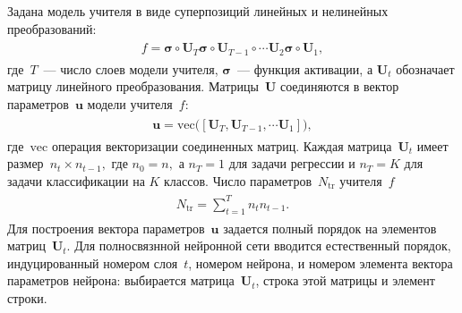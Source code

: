 \documentclass[12pt]{a&t}
\begin{document}
Задана модель учителя в виде суперпозиций линейных и нелинейных преобразований:
\begin{gather}
\label{eq:st:2}
\begin{aligned}
f = \bm{\sigma} \circ \mathbf{U}_T \bm{\sigma} \circ \mathbf{U}_{T-1}\circ \cdots  \mathbf{U}_2\bm{\sigma} \circ \mathbf{U}_1,
\end{aligned}
\end{gather}
где~$T$~--- число слоев модели учителя, $\bm{\sigma}$~--- функция активации, а $\mathbf{U}_t$ обозначает матрицу линейного преобразования. Матрицы~$\mathbf{U}$ соединяются в вектор параметров~$\mathbf{u}$ модели учителя~$f$:
\begin{gather}
\label{eq:st:2.1}
\begin{aligned}
\mathbf{u} = \text{vec}\bigr(\left[\mathbf{U}_T, \mathbf{U}_{T-1}, \cdots \mathbf{U}_1\right]\bigr),
\end{aligned}
\end{gather}
где~$\text{vec}$ операция векторизации соединенных матриц.
Каждая матрица~$\mathbf{U}_t$ имеет размер~$n_t\times n_{t-1},$ где $n_0=n,$ а  $n_T={1}$ для задачи регрессии и $n_T=K$ для задачи классификации на $K$ классов. Число параметров~$N_{\text{tr}}$ учителя~$f$
\begin{gather}
\label{eq:st:2.2}
\begin{aligned}
N_{\text{tr}} = \sum_{t=1}^{T}n_tn_{t-1}.
\end{aligned}
\end{gather}
Для построения вектора параметров~$\mathbf{u}$ задается полный порядок на элементов матриц~$\mathbf{U}_t$. Для полносвязнной нейронной сети вводится естественный порядок, индуцированный номером слоя~$t$, номером нейрона, и номером элемента вектора параметров нейрона: выбирается матрица~$\mathbf{U}_t$, строка этой матрицы и элемент строки.
\end{document}
